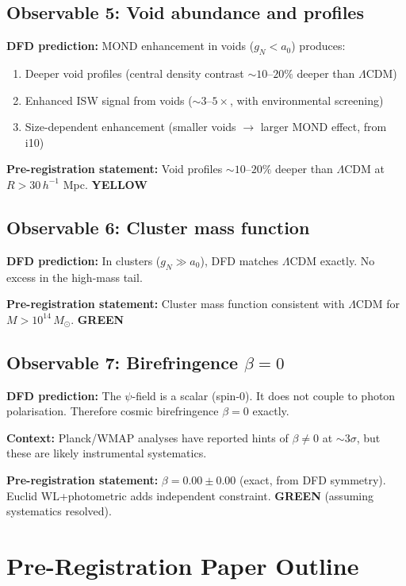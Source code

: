 \documentclass[11pt,a4paper]{article}
\newcommand{\GREEN}{\textcolor{dfdgreen}{\textbf{GREEN}}}
\newcommand{\YELLOW}{\textcolor{dfdyellow}{\textbf{YELLOW}}}
\begin{document}
\subsection{Observable 5: Void abundance and profiles}

\textbf{DFD prediction:} MOND enhancement in voids ($g_N < a_0$) produces:
\begin{enumerate}
\item Deeper void profiles (central density contrast $\sim 10$--$20\%$ deeper than $\Lambda$CDM)
\item Enhanced ISW signal from voids ($\sim 3$--$5\times$, with environmental screening)
\item Size-dependent enhancement (smaller voids $\to$ larger MOND effect, from i10)
\end{enumerate}

\textbf{Pre-registration statement:} Void profiles $\sim 10$--$20\%$ deeper than $\Lambda$CDM at $R > 30\,h^{-1}$ Mpc. \YELLOW{}

\subsection{Observable 6: Cluster mass function}

\textbf{DFD prediction:} In clusters ($g_N \gg a_0$), DFD matches $\Lambda$CDM exactly. No excess in the high-mass tail.

\textbf{Pre-registration statement:} Cluster mass function consistent with $\Lambda$CDM for $M > 10^{14}\,M_\odot$. \GREEN{}

\subsection{Observable 7: Birefringence $\beta = 0$}

\textbf{DFD prediction:} The $\psi$-field is a scalar (spin-0). It does not couple to photon polarisation. Therefore cosmic birefringence $\beta = 0$ exactly.

\textbf{Context:} Planck/WMAP analyses have reported hints of $\beta \neq 0$ at $\sim 3\sigma$, but these are likely instrumental systematics.

\textbf{Pre-registration statement:} $\beta = 0.00 \pm 0.00$ (exact, from DFD symmetry). Euclid WL+photometric adds independent constraint. \GREEN{} (assuming systematics resolved).

\section{Pre-Registration Paper Outline}
\end{document}
